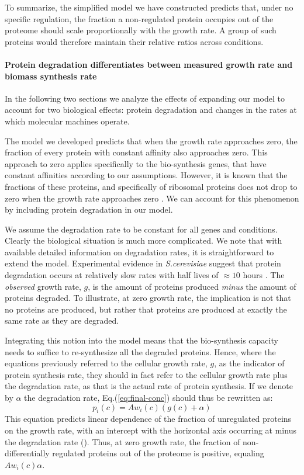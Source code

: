 \documentclass[10pt,letterpaper]{article}
\begin{document}
To summarize, the simplified model we have constructed predicts that, under no specific regulation, the fraction a non-regulated protein occupies out of the proteome should scale proportionally with the growth rate.
A group of such proteins would therefore maintain their relative ratios across conditions.

\paragraph{Protein degradation differentiates between measured growth rate and biomass synthesis rate}

In the following two sections we analyze the effects of expanding our model to account for two biological effects: protein degradation and changes in the rates at which molecular machines operate.

The model we developed predicts that when the growth rate approaches zero, the fraction of every protein with constant affinity also approaches zero.
This approach to zero applies specifically to the bio-synthesis genes, that have constant affinities according to our assumptions.
However, it is known that the fractions of these proteins, and specifically of ribosomal proteins does not drop to zero when the growth rate approaches zero \cite{ingraham1983growth,Pedersen1978a}.
We can account for this phenomenon by including protein degradation in our model.

We assume the degradation rate to be constant for all genes and conditions.
Clearly the biological situation is much more complicated.
We note that with available detailed information on degradation rates, it is straightforward to extend the model.
Experimental evidence in \emph{S.cerevisiae} suggest that protein degradation occurs at relatively slow rates with half lives of $\approx10$ hours \cite{Christiano2014}.
The \emph{observed} growth rate, $g$, is the amount of proteins produced \emph{minus} the amount of proteins degraded.
To illustrate, at zero growth rate, the implication is not that no proteins are produced, but rather that proteins are produced at exactly the same rate as they are degraded.

Integrating this notion into the model means that the bio-synthesis capacity needs to suffice to re-synthesize all the degraded proteins.
Hence, where the equations previously referred to the cellular growth rate, $g$, as the indicator of protein synthesis rate, they should in fact refer to the cellular growth rate plus the degradation rate, as that is the actual rate of protein synthesis.
If we denote by $\alpha$ the degradation rate, Eq.(\ref{eq:final-conc}) should thus be rewritten as:
\begin{equation}
  \label{eq:final-conc-deg}
  p_i(c)=Aw_i(c)(g(c)+\alpha)
\end{equation}
This equation predicts linear dependence of the fraction of unregulated proteins on the growth rate, with an intercept with the horizontal axis occurring at minus the degradation rate ().
Thus, at zero growth rate, the fraction of non-differentially regulated proteins out of the proteome is positive, equaling $Aw_i(c)\alpha$.
\end{document}
